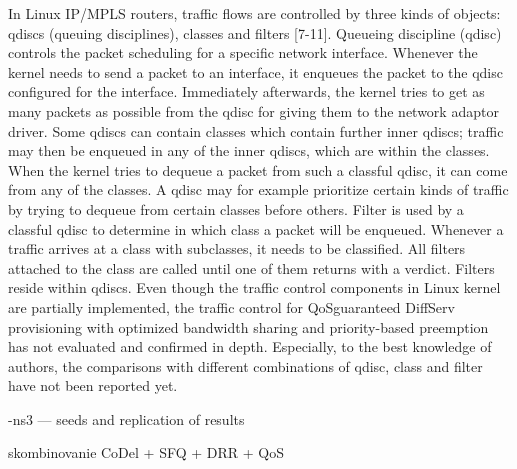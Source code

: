 In Linux IP/MPLS routers, traffic flows are controlled by
three kinds of objects: qdiscs (queuing disciplines), classes and
filters [7-11]. Queueing discipline (qdisc) controls the packet
scheduling for a specific network interface. Whenever the
kernel needs to send a packet to an interface, it enqueues the
packet to the qdisc configured for the interface. Immediately
afterwards, the kernel tries to get as many packets as possible
from the qdisc for giving them to the network adaptor driver.
Some qdiscs can contain classes which contain further
inner qdiscs; traffic may then be enqueued in any of the inner
qdiscs, which are within the classes. When the kernel tries to
dequeue a packet from such a classful qdisc, it can come from
any of the classes. A qdisc may for example prioritize certain
kinds of traffic by trying to dequeue from certain classes before
others.
Filter is used by a classful qdisc to determine in which
class a packet will be enqueued. Whenever a traffic arrives at a
class with subclasses, it needs to be classified. All filters
attached to the class are called until one of them returns with a
verdict. Filters reside within qdiscs.
Even though the traffic control components in Linux kernel
are partially implemented, the traffic control for QoSguaranteed
DiffServ provisioning with optimized bandwidth
sharing and priority-based preemption has not evaluated and
confirmed in depth. Especially, to the best knowledge of
authors, the comparisons with different combinations of qdisc,
class and filter have not been reported yet.


-ns3 --- seeds and replication of results

skombinovanie CoDel + SFQ + DRR + QoS


